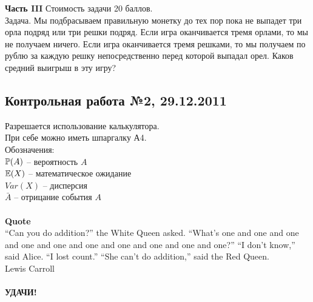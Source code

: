 \documentclass[pdftex,12pt,a4paper]{article}
\begin{document}
\begin{enumerate}

\end{enumerate}

\textbf{Часть III} Стоимость задачи 20 баллов. \\

Задача. Мы подбрасываем правильную монетку до тех пор пока не выпадет три орла подряд или три решки подряд. Если игра оканчивается тремя орлами, то мы не получаем ничего. Если игра оканчивается тремя решками, то мы получаем по рублю за каждую решку непосредственно перед которой выпадал орел. Каков средний выигрыш в эту игру?




\subsection{Контрольная работа №2, 29.12.2011}

Разрешается использование калькулятора.\\

При себе можно иметь шпаргалку А4. \\

Обозначения: \\
$\P(A)$ -- вероятность $A$ \\
$\E(X)$ -- математическое ожидание \\
$Var(X)$ -- дисперсия \\ 
$\bar{A}$ -- отрицание события $A$ \\ \\




\textbf{Quote}\\
“Can you do addition?” the White Queen asked. “What’s one and one and one and one and one and
one and one and one and one and one?”
“I don’t know,” said Alice. “I lost count.”
“She can’t do addition,” said the Red Queen. \\


Lewis Carroll \\ \\

\textbf{УДАЧИ!} \\ 
\end{document}
